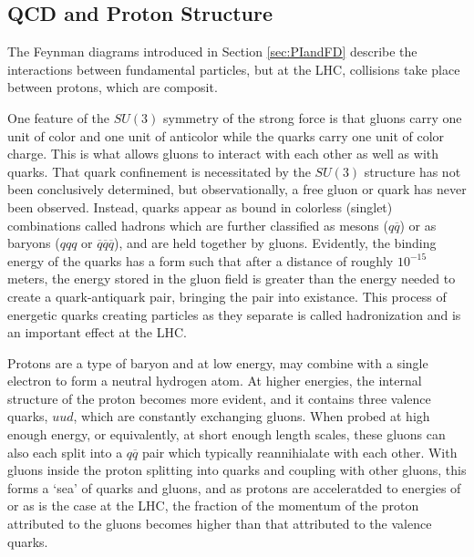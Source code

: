 \subsection{QCD and Proton Structure}
 The Feynman diagrams introduced in Section \ref{sec:PIandFD}
  describe the interactions between fundamental particles,
  but at the LHC, collisions take place between
  protons, which are composit.

 One feature of the $SU(3)$ symmetry of the
  strong force is that gluons
  carry one unit of color and one unit of anticolor
  while the quarks carry one unit of color charge.
 This is what allows gluons to interact with each other
  as well as with quarks.
 That quark confinement is necessitated by the $SU(3)$
  structure has not been conclusively determined, 
  but observationally, a free gluon or quark has 
  never been observed.
 Instead, quarks appear as bound in colorless (singlet)
  combinations called hadrons
  which are further classified as mesons ($q\overline{q}$)
  or as baryons ($qqq$ or
  $\overline{q}\overline{q}\overline{q}$),
  and are held together by gluons.
 Evidently, the binding energy of the
  quarks has a form such that
  after a distance of roughly $10^{-15}$ meters,
  the energy
  stored in the gluon field is greater
  than the energy needed to create a
  quark-antiquark pair, bringing the pair
  into existance.
 This process of energetic quarks
  creating particles as they
  separate is called hadronization
  and is an important effect at the LHC.

 Protons are a type of baryon and
  at low energy, may combine with a single electron 
  to form a neutral hydrogen atom.
 At higher energies, the internal structure 
  of the proton becomes more evident,
  and it contains three valence quarks, $uud$, 
  which are constantly exchanging gluons.
 When probed at high enough energy, or equivalently,
  at short enough length scales, these 
  gluons can also each split into a $q\overline{q}$ pair 
  which typically reannihialate with each other.
 With gluons inside the proton splitting into quarks
  and coupling with other gluons,
  this forms a `sea' of quarks and gluons,
  and as protons are acceleratded
  to energies of \GeV or \TeV as is the case at the
  LHC, the fraction of the momentum of the
  proton attributed to the gluons becomes higher 
  than that attributed to the valence quarks.

